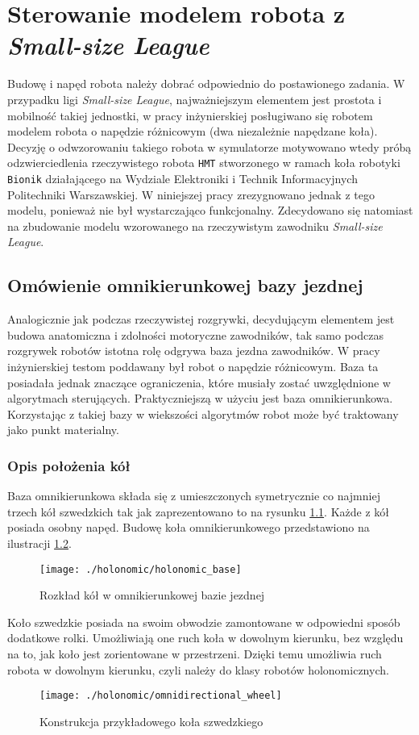 \chapter[Sterowanie modelem robota z \emph{Small-size League}]{Sterowanie modelem robota z \emph{Small-size League} \label{chap:holonomic}}
Budowę i napęd robota należy dobrać odpowiednio do postawionego zadania. W przypadku ligi \emph{Small-size League}, najważniejszym elementem jest prostota i mobilność
takiej jednostki, w pracy inżynierskiej \cite{inzynierka} posługiwano się robotem modelem robota o napędzie różnicowym (dwa niezależnie napędzane koła). Decyzję o odwzorowaniu takiego robota
w symulatorze motywowano wtedy próbą odzwierciedlenia rzeczywistego robota \texttt{HMT} \cite{hamada_mgr} stworzonego w ramach koła robotyki \texttt{Bionik} działającego na Wydziale Elektroniki i Technik Informacyjnych Politechniki
Warszawskiej. W niniejszej pracy zrezygnowano jednak z tego modelu, ponieważ nie był wystarczająco funkcjonalny. Zdecydowano się natomiast na zbudowanie modelu wzorowanego na rzeczywistym zawodniku \emph{Small-size League}.  
\section{Omówienie omnikierunkowej bazy jezdnej}
Analogicznie jak podczas rzeczywistej rozgrywki, decydującym elementem jest budowa anatomiczna i zdolności motoryczne zawodników, tak samo podczas
rozgrywek robotów istotna rolę odgrywa baza jezdna zawodników. W pracy inżynierskiej testom poddawany był robot o napędzie różnicowym. Baza ta posiadała jednak 
znaczące ograniczenia, które musiały zostać uwzględnione w algorytmach sterujących. Praktyczniejszą w użyciu jest baza omnikierunkowa. Korzystając z takiej bazy w
wiekszości algorytmów robot może być traktowany jako punkt materialny.
\subsection{Opis położenia kół}
Baza omnikierunkowa składa się z umieszczonych symetrycznie co najmniej trzech kół szwedzkich tak jak zaprezentowano to na rysunku \ref{fig:holonomic_base}.
Każde z kół posiada osobny napęd. Budowę koła omnikierunkowego przedstawiono na ilustracji \ref{fig:omnidirectional_wheel}. 
\begin{figure}[h]
\centering
\texttt{[image: ./holonomic/holonomic\_base]}
\caption{ Rozkład kół w omnikierunkowej bazie jezdnej }\label{fig:holonomic_base}
\end{figure}
Koło szwedzkie posiada na swoim
obwodzie zamontowane w odpowiedni sposób dodatkowe rolki. Umożliwiają one ruch koła w dowolnym kierunku, bez względu na to, 
jak koło jest zorientowane w przestrzeni. Dzięki temu umożliwia ruch robota w dowolnym kierunku, czyli należy do klasy robotów holonomicznych.
\begin{figure}[h]
\centering
\texttt{[image: ./holonomic/omnidirectional\_wheel]}
\caption{ Konstrukcja przykładowego koła szwedzkiego }\label{fig:omnidirectional_wheel}
\end{figure}
